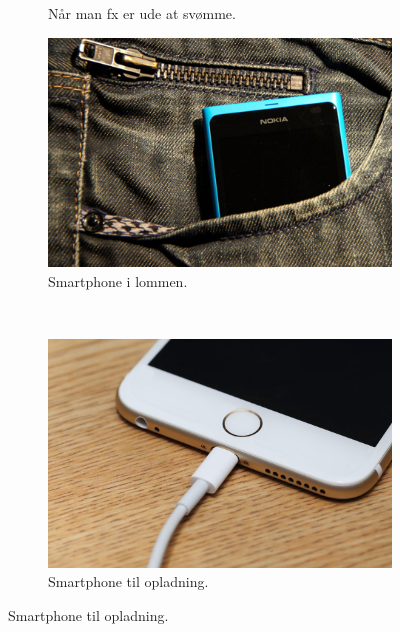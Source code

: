 \begin{frame}
\begin{figure}
\begin{minipage}{\textwidth}
\begin{subfigure}[b]{0.3\textwidth}
                \caption{Når man fx er ude at svømme.}
                \label{context:swimmer}
        \end{subfigure}
\end{minipage}
\begin{minipage}{\textwidth}
	\begin{subfigure}[b]{0.3\textwidth}
		\includegraphics[width=\textwidth]{graphics/smartphone_pocket}
		\caption{Smartphone i lommen.}
		\label{context:pocket}
		\end{subfigure}
		~ %
		\begin{subfigure}[b]{0.3\textwidth}
			\includegraphics[width=\textwidth]{graphics/smartphone_charging}
			\caption{Smartphone til opladning.}
			\label{context:charging}
			\end{subfigure}

\end{minipage}
\end{figure}
\end{frame}
